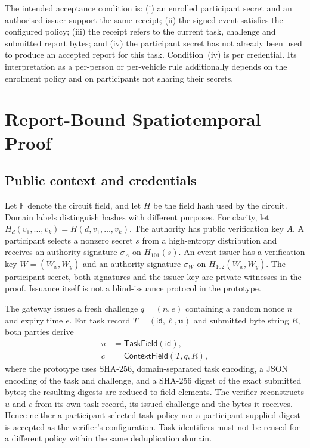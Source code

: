 The intended acceptance condition is: (i) an enrolled participant secret and an authorised issuer support the same receipt; (ii) the signed event satisfies the configured policy; (iii) the receipt refers to the current task, challenge and submitted report bytes; and (iv) the participant secret has not already been used to produce an accepted report for this task. Condition~(iv) is per credential. Its interpretation as a per-person or per-vehicle rule additionally depends on the enrolment policy and on participants not sharing their secrets.

\section{Report-Bound Spatiotemporal Proof}
\label{sec:protocol}

\subsection{Public context and credentials}
\label{sec:context}

Let $\mathbb F$ denote the circuit field, and let $H$ be the field hash used by the circuit. Domain labels distinguish hashes with different purposes. For clarity, let $H_d(v_1,\ldots,v_k)=H(d,v_1,\ldots,v_k)$. The authority has public verification key $A$. A participant selects a nonzero secret $s$ from a high-entropy distribution and receives an authority signature $\sigma_A$ on $H_{101}(s)$. An event issuer has a verification key $W=(W_x,W_y)$ and an authority signature $\sigma_W$ on $H_{102}(W_x,W_y)$. The participant secret, both signatures and the issuer key are private witnesses in the proof. Issuance itself is not a blind-issuance protocol in the prototype.

The gateway issues a fresh challenge $q=(n,e)$ containing a random nonce $n$ and expiry time $e$. For task record $T=(\mathsf{id},\boldsymbol{\ell},\boldsymbol u)$ and submitted byte string $R$, both parties derive
\begin{align}
 u&=\mathsf{TaskField}(\mathsf{id}),\\
 c&=\mathsf{ContextField}(T,q,R),
\end{align}
where the prototype uses SHA-256, domain-separated task encoding, a JSON encoding of the task and challenge, and a SHA-256 digest of the exact submitted bytes; the resulting digests are reduced to field elements. The verifier reconstructs $u$ and $c$ from its own task record, its issued challenge and the bytes it receives. Hence neither a participant-selected task policy nor a participant-supplied digest is accepted as the verifier's configuration. Task identifiers must not be reused for a different policy within the same deduplication domain.

